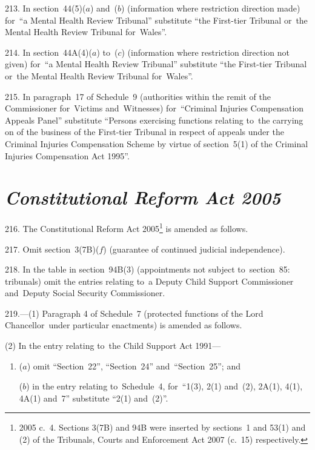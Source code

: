 \documentclass[12pt,a4paper]{article}
\begin{document}
\medskip

213.  In section~44(5)($a$)  and~($b$)  (information where restriction direction made) for~“a Mental Health Review Tribunal” substitute “the First-tier Tribunal or~the Mental Health Review Tribunal for~Wales”.

\medskip

214.  In section~44A(4)($a$)  to~($c$)  (information where restriction direction not given) for~“a Mental Health Review Tribunal” substitute “the First-tier Tribunal or~the Mental Health Review Tribunal for~Wales”.

\medskip

215.  In paragraph~17 of Schedule~9 (authorities within the remit of the Commissioner for~Victims and~Witnesses) for~“Criminal Injuries Compensation Appeals Panel” substitute “Persons exercising functions relating to~the carrying on of the business of the First-tier Tribunal in respect of appeals under the Criminal Injuries Compensation Scheme by virtue of section~5(1) of the Criminal Injuries Compensation Act 1995”.

\section*{\itshape Constitutional Reform Act 2005}

216.  The Constitutional Reform Act 2005\footnote{2005 c.~4. Sections 3(7B) and 94B were inserted by sections~1 and 53(1) and (2) of the Tribunals, Courts and Enforcement Act 2007 (c.~15) respectively.} is amended as follows.

\medskip

217.  Omit section~3(7B)($f$)  (guarantee of continued judicial independence).

\medskip

218.  In the table in section~94B(3) (appointments not subject to~section~85: tribunals) omit the entries relating to~a Deputy Child Support Commissioner and~Deputy Social Security Commissioner.

\medskip

219.---(1)  Paragraph 4 of Schedule~7 (protected functions of the Lord Chancellor~under particular enactments) is amended as follows.

(2) In the entry relating to~the Child Support Act 1991—
\begin{enumerate}\item[]
($a$) omit “Section~22”, “Section~24” and~“Section~25”; and

($b$) in the entry relating to~Schedule~4, for~“1(3), 2(1) and~(2), 2A(1), 4(1), 4A(1) and~7” substitute “2(1) and~(2)”.
\end{enumerate}
\end{document}
